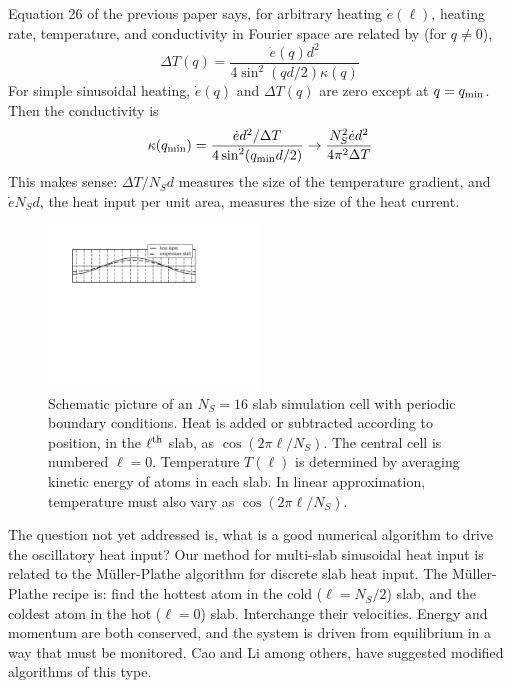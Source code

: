\documentclass[aps,prb,twocolumn,showpacs,superscriptaddress]{revtex4-1}\begin{tiny}\end{tiny}
\begin{document}
Equation 26 of the previous paper \cite{Allen} says, for arbitrary
heating ${\dot e}(\ell)$, heating rate, temperature, and conductivity
in Fourier space are related by (for $q\ne 0$), 
%
\begin{equation}
\Delta T(q)=\frac{{\dot e}(q)d^2}{4\sin^2 (qd/2) \kappa(q)}
\label{eq:nonlocal}
\end{equation}
%
For simple sinusoidal heating, ${\dot e}(q)$ and $\Delta T(q)$ are zero except
at $q=q_{\rm min}$.  Then the conductivity is
%
\begin{equation}
\kappa(q_{\rm min})=\frac{{\dot e}d^2/\Delta T}{4\sin^2(q_{\rm min} d/2)}
\rightarrow \frac{N_S^2{\dot e}d^2}{4\pi^2 \Delta T}
\label{eq:kappa}
\end{equation}
%
This makes sense:  $\Delta T/N_S d$ measures the size of the temperature gradient, 
and ${\dot e}N_S d$, the heat input per unit area, measures the size of the heat current.

 
\par
\begin{figure}[top]
\includegraphics[angle=0,width=0.5\textwidth]{slab.pdf}
\caption{\label{fig:slab} Schematic picture of an $N_S=16$ slab simulation cell
with periodic boundary conditions.  Heat is
added or subtracted according to position, in the $\ell^{\rm th}$ slab, as $\cos(2\pi \ell/N_S)$.
The central cell is numbered $\ell=0$.
Temperature $T(\ell)$ is determined by averaging kinetic energy of atoms in each slab.  In linear
approximation, temperature must also vary as $\cos(2\pi \ell/N_S)$.}
\end{figure}
\par

The question not yet addressed is, what is a good numerical algorithm to drive the oscillatory
heat input?  Our method for multi-slab sinusoidal heat input is related to  the  M\"uller-Plathe \cite{FMP}  algorithm
for discrete slab heat input.  The M\"uller-Plathe recipe is:
find the hottest atom in the cold ($\ell=N_S/2$) slab, and
the coldest atom in the hot ($\ell=0$) slab.  Interchange their velocities.  Energy and momentum
are both conserved, and the system is driven from equilibrium in a 
way that must be monitored.  Cao and Li \cite{Cao} among others,
have suggested modified algorithms of this type. 
\end{document}
